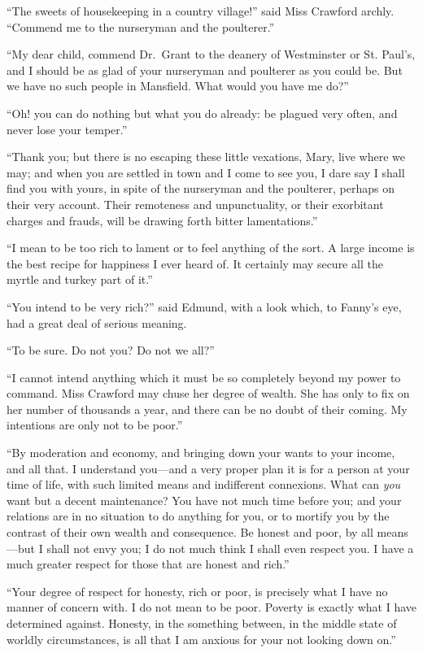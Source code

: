 ``The sweets of housekeeping in a country village!''
said Miss Crawford archly.  ``Commend me to the nurseryman
and the poulterer.''

``My dear child, commend Dr.\ Grant to the deanery
of Westminster or St. Paul's, and I should be as glad
of your nurseryman and poulterer as you could be.  But we
have no such people in Mansfield.  What would you have me do?''

``Oh! you can do nothing but what you do already:
be plagued very often, and never lose your temper.''

``Thank you; but there is no escaping these little vexations,
Mary, live where we may; and when you are settled in town
and I come to see you, I dare say I shall find you
with yours, in spite of the nurseryman and the poulterer,
perhaps on their very account.  Their remoteness
and unpunctuality, or their exorbitant charges and frauds,
will be drawing forth bitter lamentations.''

``I mean to be too rich to lament or to feel anything
of the sort.  A large income is the best recipe for
happiness I ever heard of.  It certainly may secure
all the myrtle and turkey part of it.''

``You intend to be very rich?'' said Edmund, with a look which,
to Fanny's eye, had a great deal of serious meaning.

``To be sure.  Do not you?  Do not we all?''

``I cannot intend anything which it must be so completely
beyond my power to command.  Miss Crawford may chuse her
degree of wealth.  She has only to fix on her number of
thousands a year, and there can be no doubt of their coming.
My intentions are only not to be poor.''

``By moderation and economy, and bringing down your wants
to your income, and all that.  I understand you---and a
very proper plan it is for a person at your time of life,
with such limited means and indifferent connexions.
What can \emph{you} want but a decent maintenance?  You have
not much time before you; and your relations are in no
situation to do anything for you, or to mortify you
by the contrast of their own wealth and consequence.
Be honest and poor, by all means---but I shall not
envy you; I do not much think I shall even respect you.
I have a much greater respect for those that are honest
and rich.''

``Your degree of respect for honesty, rich or poor,
is precisely what I have no manner of concern with.
I do not mean to be poor.  Poverty is exactly what I have
determined against.  Honesty, in the something between,
in the middle state of worldly circumstances, is all that I
am anxious for your not looking down on.''

